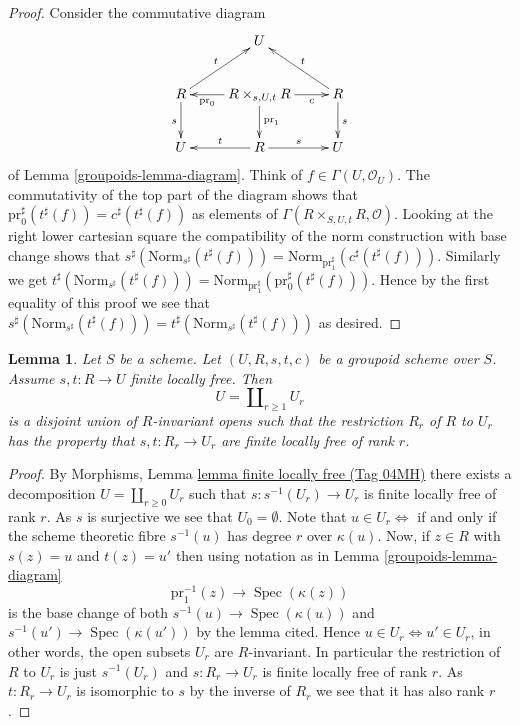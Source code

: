\documentclass{amsart}
\theoremstyle{plain}
\newtheorem{lemma}[subsection]{Lemma}
\theoremstyle{definition}
\theoremstyle{remark}
\numberwithin{equation}{subsection}
\def\Spec{\mathop{\mathrm{Spec}}}
\begin{document}
\begin{proof}
Consider the commutative diagram
$$
\xymatrix{
& U & \\
R \ar[d]_s \ar[ru]^t &
R \times_{s, U, t} R
\ar[l]^-{\text{pr}_0} \ar[d]^{\text{pr}_1} \ar[r]_-c &
R \ar[d]^s \ar[lu]_t \\
U & R \ar[l]_t \ar[r]^s & U
}
$$
of Lemma \ref{groupoids-lemma-diagram}.
Think of $f \in \Gamma(U, \mathcal{O}_U)$. The commutativity of the
top part of the diagram shows that
$\text{pr}_0^\sharp(t^\sharp(f)) = c^\sharp(t^\sharp(f))$ as elements of
$\Gamma(R \times_{S, U, t} R, \mathcal{O})$.
Looking at the right lower cartesian square
the compatibility of the norm construction with base change shows that
$s^\sharp(\text{Norm}_{s^\sharp}(t^\sharp(f))) =
\text{Norm}_{\text{pr}_1^\sharp}(c^\sharp(t^\sharp(f)))$.
Similarly we get
$t^\sharp(\text{Norm}_{s^\sharp}(t^\sharp(f))) =
\text{Norm}_{\text{pr}_1^\sharp}(\text{pr}_0^\sharp(t^\sharp(f)))$.
Hence by the first equality of this proof we see that
$s^\sharp(\text{Norm}_{s^\sharp}(t^\sharp(f))) =
t^\sharp(\text{Norm}_{s^\sharp}(t^\sharp(f)))$ as desired.
\end{proof}


\begin{lemma}
\label{groupoids-lemma-finite-locally-free-disjoint-free}
Let $S$ be a scheme. Let $(U, R, s, t, c)$ be a groupoid scheme over $S$.
Assume $s, t : R \to U$ finite locally free.
Then
$$
U = \coprod\nolimits_{r \geq 1} U_r
$$
is a disjoint union of $R$-invariant opens such that the restriction $R_r$ of
$R$ to $U_r$ has the property that $s, t : R_r \to U_r$ are finite locally
free of rank $r$.
\end{lemma}

\begin{proof}
By
Morphisms, Lemma \href{https://stacks.math.columbia.edu/tag/04MH}{lemma finite locally free (Tag 04MH)}
there exists a decomposition
$U = \coprod\nolimits_{r \geq 0} U_r$
such that $s : s^{-1}(U_r) \to U_r$ is finite locally free of rank $r$.
As $s$ is surjective we see that $U_0 = \emptyset$.
Note that $u \in U_r \Leftrightarrow$ if and only if the scheme theoretic fibre
$s^{-1}(u)$ has degree $r$ over $\kappa(u)$. Now, if $z \in R$ with $s(z) = u$
and $t(z) = u'$ then using notation as in Lemma \ref{groupoids-lemma-diagram}
$$
\text{pr}_1^{-1}(z) \to \Spec(\kappa(z))
$$
is the base change of both
$s^{-1}(u) \to \Spec(\kappa(u))$ and $s^{-1}(u') \to \Spec(\kappa(u'))$
by the lemma cited. Hence $u \in U_r \Leftrightarrow u' \in U_r$,
in other words, the open subsets $U_r$ are $R$-invariant.
In particular the restriction of $R$ to $U_r$ is just
$s^{-1}(U_r)$ and $s : R_r \to U_r$ is finite locally free of rank $r$.
As $t : R_r \to U_r$ is isomorphic to $s$ by the inverse of $R_r$
we see that it has also rank $r$.
\end{proof}
\end{document}
